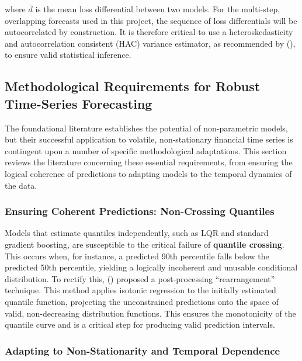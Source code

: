 \documentclass[
  a4paper,
  DIV=11,
  numbers=noendperiod]{scrreprt}
\begin{document}
where \(\bar{d}\) is the mean loss differential between two models. For
the multi-step, overlapping forecasts used in this project, the sequence
of loss differentials will be autocorrelated by construction. It is
therefore critical to use a heteroskedasticity and autocorrelation
consistent (HAC) variance estimator, as recommended by
(), to ensure valid statistical
inference.

\subsection{Methodological Requirements for Robust Time-Series
Forecasting}\label{methodological-requirements-for-robust-time-series-forecasting}

The foundational literature establishes the potential of non-parametric
models, but their successful application to volatile, non-stationary
financial time series is contingent upon a number of specific
methodological adaptations. This section reviews the literature
concerning these essential requirements, from ensuring the logical
coherence of predictions to adapting models to the temporal dynamics of
the data.

\subsubsection{Ensuring Coherent Predictions: Non-Crossing
Quantiles}\label{ensuring-coherent-predictions-non-crossing-quantiles}

Models that estimate quantiles independently, such as LQR and standard
gradient boosting, are susceptible to the critical failure of
\textbf{quantile crossing}. This occurs when, for instance, a predicted
90th percentile falls below the predicted 50th percentile, yielding a
logically incoherent and unusable conditional distribution. To rectify
this, () proposed a post-processing ``rearrangement'' technique.
This method applies isotonic regression to the initially estimated
quantile function, projecting the unconstrained predictions onto the
space of valid, non-decreasing distribution functions. This ensures the
monotonicity of the quantile curve and is a critical step for producing
valid prediction intervals.

\subsubsection{Adapting to Non-Stationarity and Temporal
Dependence}\label{adapting-to-non-stationarity-and-temporal-dependence}
\end{document}
